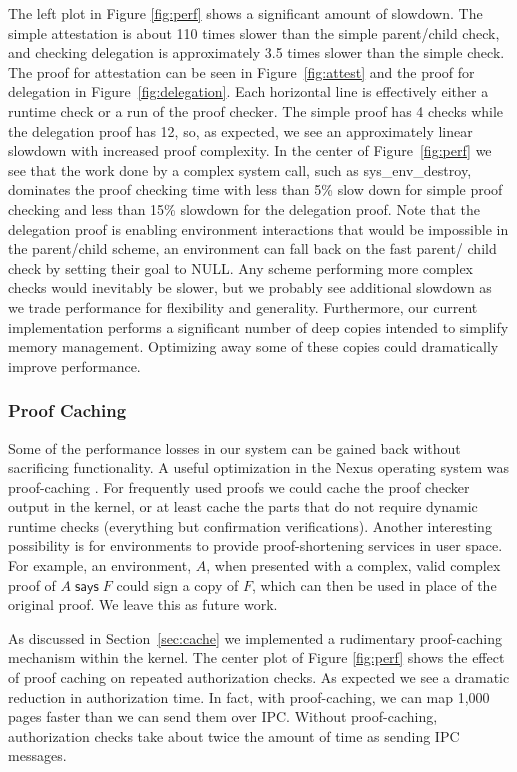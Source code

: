 \documentclass[10pt]{article}
\newcommand{\says}[2]{\ensuremath{#1\;\textsf{says}\;#2}}
\begin{document}
The left plot in Figure \ref{fig:perf} shows a significant amount of slowdown.  The simple attestation is about 110 times slower than the simple parent/child check, and checking delegation is approximately 3.5 times slower than the simple check.  The proof for attestation can be seen in Figure~\ref{fig:attest} and the proof for delegation in Figure~\ref{fig:delegation}.  Each horizontal line is effectively either a runtime check or a run of the proof checker.  The simple proof has 4 checks while the delegation proof has 12, so, as expected, we see an approximately linear slowdown with increased proof complexity.  In the center of Figure~\ref{fig:perf} we see that the work done by a complex system call, such as \textsf{sys\_env\_destroy}, dominates the proof checking time with less than 5\% slow down for simple proof checking and less than 15\% slowdown for the delegation proof.  Note that the delegation proof is enabling environment interactions that would be impossible in the parent/child scheme, an environment can fall back on the fast parent/ child check by setting their goal to \textsf{NULL}.  Any scheme performing more complex checks would inevitably be slower, but we probably see additional slowdown as we trade performance for flexibility and generality. Furthermore, our current implementation performs a significant number of deep copies intended to simplify memory management. Optimizing away some of these copies could dramatically improve performance.

\subsubsection{Proof Caching}\label{sec:cacheperf}
Some of the performance losses in our system can be gained back without sacrificing functionality. A useful optimization in the Nexus operating system was proof-caching \cite{Nexus}.  For frequently used proofs we could cache the proof checker output in the kernel, or at least cache the parts that do not require dynamic runtime checks (everything but confirmation verifications). Another interesting possibility is for environments to provide proof-shortening services in user space. For example, an environment, $A$, when presented with a complex, valid complex proof of $\says{A}{F}$ could sign a copy of $F$, which can then be used in place of the original proof. We leave this as future work.

As discussed in Section~\ref{sec:cache} we implemented a rudimentary proof-caching mechanism within the kernel. The center plot of Figure \ref{fig:perf} shows the effect of proof caching on repeated authorization checks.  As expected we see a dramatic reduction in authorization time.  In fact, with proof-caching, we can map 1,000 pages faster than we can send them over IPC. Without proof-caching, authorization checks take about twice the amount of time as sending IPC messages.
\end{document}
